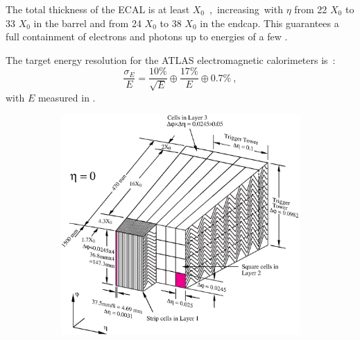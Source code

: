 The total thickness of the ECAL is at least \unit[22]{$X_0$}, increasing with $\eta$ from 22 $X_0$ to 33 $X_0$ in the barrel and from 24 $X_0$ to 38 $X_0$ in the endcap.
This guarantees a full containment of electrons and photons up to energies of a few \tev.

The target energy resolution for the ATLAS electromagnetic calorimeters is~\cite{LARtdr}:
\begin{equation}
  \frac{\sigma_E}{E}=\frac{10\%}{\sqrt{E}} \oplus \frac{17 \%}{E} \oplus 0.7\%~,
  \label{eq:LAr_resolution}
\end{equation}
with $E$ measured in \gev.

\begin{figure}[!ht]
  \begin{center}
    \begin{subfigure}[b]{0.49\textwidth}
      \includegraphics[width=\textwidth]{ATLASdetector/Figures/LAr_Module.eps}
      \caption{}
      \label{fig:LArModule}
    \end{subfigure}
    \begin{subfigure}[b]{0.49\textwidth}

\end{subfigure}
\end{center}
\end{figure}
